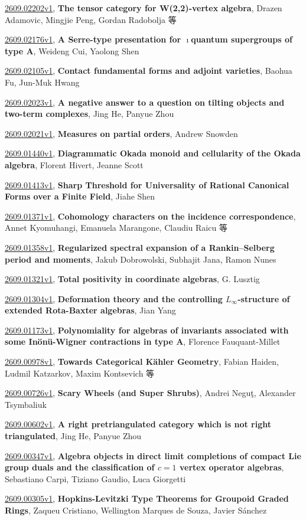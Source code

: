 \documentclass[9pt, a4paper]{article}
\theoremstyle{plain}
\theoremstyle{definition}
\theoremstyle{remark}
\newcommand{\arxiv}[3]{\href{https://arxiv.org/abs/#1}{#1}, \textbf{\textcolor{arxivblue}{#2}}, #3}
\begin{document}
\arxiv{2609.02202v1}{The tensor category for W(2,2)-vertex algebra}{Drazen Adamovic, Mingjie Peng, Gordan Radobolja 等}

\arxiv{2609.02176v1}{A Serre-type presentation for $\imath$quantum supergroups of type A}{Weideng Cui, Yaolong Shen}

\arxiv{2609.02105v1}{Contact fundamental forms and adjoint varieties}{Baohua Fu, Jun-Muk Hwang}

\arxiv{2609.02023v1}{A negative answer to a question on tilting objects and two-term complexes}{Jing He, Panyue Zhou}

\arxiv{2609.02021v1}{Measures on partial orders}{Andrew Snowden}

\arxiv{2609.01440v1}{Diagrammatic Okada monoid and cellularity of the Okada algebra}{Florent Hivert, Jeanne Scott}

\arxiv{2609.01413v1}{Sharp Threshold for Universality of Rational Canonical Forms over a Finite Field}{Jiahe Shen}

\arxiv{2609.01371v1}{Cohomology characters on the incidence correspondence}{Annet Kyomuhangi, Emanuela Marangone, Claudiu Raicu 等}

\arxiv{2609.01358v1}{Regularized spectral expansion of a Rankin--Selberg period and moments}{Jakub Dobrowolski, Subhajit Jana, Ramon Nunes}

\arxiv{2609.01321v1}{Total positivity in coordinate algebras}{G. Lusztig}

\arxiv{2609.01304v1}{Deformation theory and the controlling $L_{\infty}$-structure of extended Rota-Baxter algebras}{Jian Yang}

\arxiv{2609.01173v1}{Polynomiality for algebras of invariants associated with some Inönü-Wigner contractions in type A}{Florence Fauquant-Millet}

\arxiv{2609.00978v1}{Towards Categorical Kähler Geometry}{Fabian Haiden, Ludmil Katzarkov, Maxim Kontsevich 等}

\arxiv{2609.00726v1}{Scary Wheels (and Super Shrubs)}{Andrei Neguţ, Alexander Tsymbaliuk}

\arxiv{2609.00602v1}{A right pretriangulated category which is not right triangulated}{Jing He, Panyue Zhou}

\arxiv{2609.00347v1}{Algebra objects in direct limit completions of compact Lie group duals and the classification of $c=1$ vertex operator algebras}{Sebastiano Carpi, Tiziano Gaudio, Luca Giorgetti}

\arxiv{2609.00305v1}{Hopkins-Levitzki Type Theorems for Groupoid Graded Rings}{Zaqueu Cristiano, Wellington Marques de Souza, Javier Sánchez}
\end{document}
